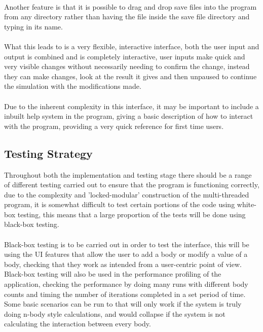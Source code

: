 \paragraph{}
Another feature is that it is possible to drag and drop save files into the program from any directory rather than having the file inside the save file directory and typing in its name.

\paragraph{}
What this leads to is a very flexible, interactive interface, both the user input and output is combined and is completely interactive, user inputs make quick and very visible changes without necessarily needing to confirm the change, instead they can make changes, look at the result it gives and then unpaused to continue the simulation with the modifications made.

\paragraph{}
Due to the inherent complexity in this interface, it may be important to include a inbuilt help system in the program, giving a basic description of how to interact with the program, providing a very quick reference for first time users.

\pagebreak
\subsection{Testing Strategy}
Throughout both the implementation and testing stage there should be a range of different testing carried out to ensure that the program is functioning correctly, due to the complexity and 'locked-modular' construction of the multi-threaded program, it is somewhat difficult to test certain portions of the code using white-box testing, this means that a large proportion of the tests will be done using black-box testing.

\paragraph{}
Black-box testing is to be carried out in order to test the interface, this will be using the UI features that allow the user to add a body or modify a value of a body, checking that they work as intended from a user-centric point of view. Black-box testing will also be used in the performance profiling of the application, checking the performance by doing many runs with different body counts and timing the number of iterations completed in a set period of time. Some basic scenarios can be run to that will only work if the system is truly doing n-body style calculations, and would collapse if the system is not calculating the interaction between every body.

